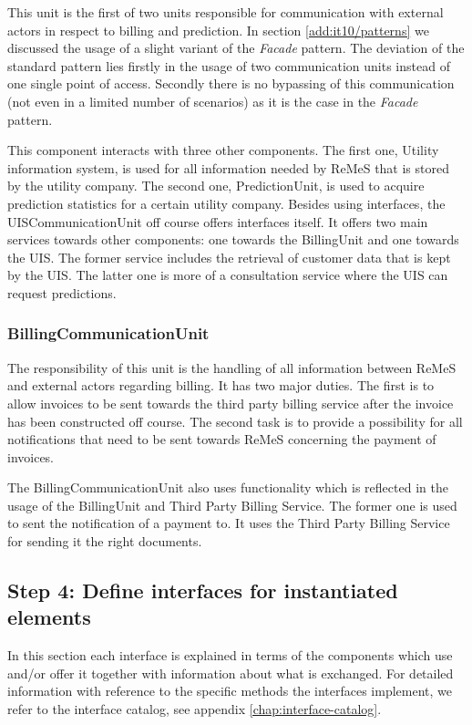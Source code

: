 \npar This unit is the first of two units responsible for communication with
external actors in respect to billing and prediction. In section
\ref{add:it10/patterns} we discussed the usage of a slight variant of the
\emph{Facade} pattern. The deviation of the standard pattern lies firstly in the
usage of two communication units instead of one single point of access.
Secondly there is no bypassing of this communication (not even in a limited
number of scenarios) as it is the case in the \emph{Facade} pattern.

\npar This component interacts with three other components. The first one,
Utility information system, is used for all information needed by ReMeS that is
stored by the utility company. The second one, PredictionUnit, is used to
acquire prediction statistics for a certain utility company. Besides using
interfaces, the UISCommunicationUnit off course offers interfaces itself. It
offers two main services towards other components: one towards the BillingUnit
and one towards the UIS. The former service includes the retrieval of customer
data that is kept by the UIS. The latter one is more of a consultation service
where the UIS can request predictions.

\subsubsection{BillingCommunicationUnit}

\npar The responsibility of this unit is the handling of all information between
ReMeS and external actors regarding billing. It has two major duties. The first
is to allow invoices to be sent towards the third party billing service after
the invoice has been constructed off course. The second task is to provide a
possibility for all notifications that need to be sent towards ReMeS concerning
the payment of invoices.

\npar The BillingCommunicationUnit also uses functionality which is reflected in
the usage of the BillingUnit and Third Party Billing Service. The former one is
used to sent the notification of a payment to. It uses the Third Party Billing
Service for sending it the right documents.

\subsection{Step 4: Define interfaces for instantiated elements}
\label{add:it10/interfaces}

\npar In this section each interface is explained in terms of the components
which use and/or offer it together with information about what is exchanged. For
detailed information with reference to the specific methods the interfaces
implement, we refer to the interface catalog, see appendix
\ref{chap:interface-catalog}.

